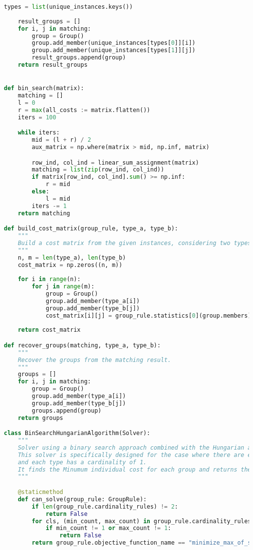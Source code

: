 \begin{apendicesenv}
\begin{lstlisting}[language=Python, caption={Hungarian Algorithm with Binary Search Solver Source Code}]
    types = list(unique_instances.keys())
    
    result_groups = []
    for i, j in matching:
        group = Group()
        group.add_member(unique_instances[types[0]][i])
        group.add_member(unique_instances[types[1]][j])
        result_groups.append(group)
    return result_groups


def bin_search(matrix):
    matching = []
    l = 0
    r = max(all_costs := matrix.flatten())
    iters = 100

    while iters:
        mid = (l + r) / 2
        aux_matrix = np.where(matrix > mid, np.inf, matrix)

        row_ind, col_ind = linear_sum_assignment(matrix)
        matching = list(zip(row_ind, col_ind))
        if matrix[row_ind, col_ind].sum() >= np.inf:
            r = mid
        else:
            l = mid
        iters -= 1
    return matching

def build_cost_matrix(group_rule, type_a, type_b):
    """
    Build a cost matrix from the given instances, considering two types of objects.
    """
    n, m = len(type_a), len(type_b)
    cost_matrix = np.zeros((n, m))
    
    for i in range(n):
        for j in range(m):
            group = Group()
            group.add_member(type_a[i])
            group.add_member(type_b[j])
            cost_matrix[i][j] = group_rule.statistics[0](group.members)
    
    return cost_matrix

def recover_groups(matching, type_a, type_b):
    """
    Recover the groups from the matching result.
    """
    groups = []
    for i, j in matching:
        group = Group()
        group.add_member(type_a[i])
        group.add_member(type_b[j])
        groups.append(group)
    return groups

class BinSearchHungarianAlgorithm(Solver):
    """
    Solver using a binary search approach combined with the Hungarian algorithm.
    This solver is specifically designed for the case where there are exactly two types of objects
    and each type has a cardinality of 1.
    It finds the Minumum individual cost for each group and returns the groups.
    """

    @staticmethod
    def can_solve(group_rule: GroupRule):
        if len(group_rule.cardinality_rules) != 2:
            return False
        for cls, (min_count, max_count) in group_rule.cardinality_rules.items():
            if min_count != 1 or max_count != 1:
                return False
        return group_rule.objective_function_name == "minimize_max_of_single_statistic"


\end{lstlisting}
\end{apendicesenv}
